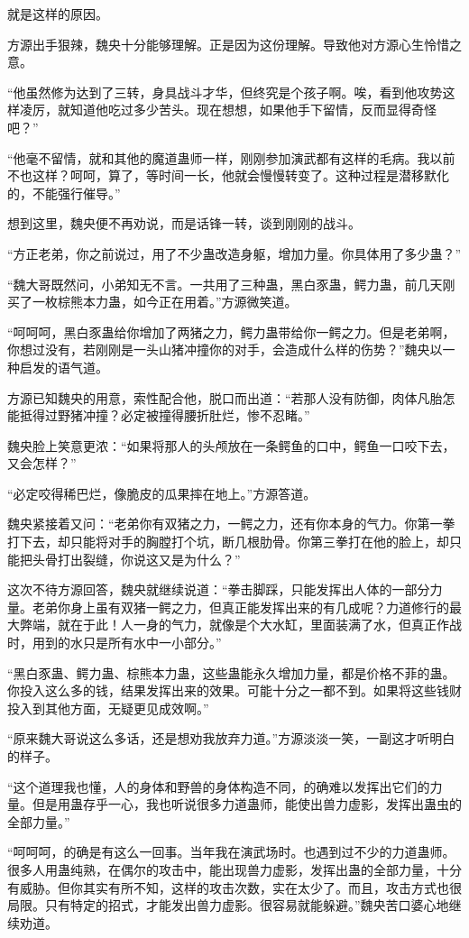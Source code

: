 \begin{this_body}
就是这样的原因。

方源出手狠辣，魏央十分能够理解。正是因为这份理解。导致他对方源心生怜惜之意。

“他虽然修为达到了三转，身具战斗才华，但终究是个孩子啊。唉，看到他攻势这样凌厉，就知道他吃过多少苦头。现在想想，如果他手下留情，反而显得奇怪吧？”

“他毫不留情，就和其他的魔道蛊师一样，刚刚参加演武都有这样的毛病。我以前不也这样？呵呵，算了，等时间一长，他就会慢慢转变了。这种过程是潜移默化的，不能强行催导。”

想到这里，魏央便不再劝说，而是话锋一转，谈到刚刚的战斗。

“方正老弟，你之前说过，用了不少蛊改造身躯，增加力量。你具体用了多少蛊？”

“魏大哥既然问，小弟知无不言。一共用了三种蛊，黑白豕蛊，鳄力蛊，前几天刚买了一枚棕熊本力蛊，如今正在用着。”方源微笑道。

“呵呵呵，黑白豕蛊给你增加了两猪之力，鳄力蛊带给你一鳄之力。但是老弟啊，你想过没有，若刚刚是一头山猪冲撞你的对手，会造成什么样的伤势？”魏央以一种启发的语气道。

方源已知魏央的用意，索性配合他，脱口而出道：“若那人没有防御，肉体凡胎怎能抵得过野猪冲撞？必定被撞得腰折肚烂，惨不忍睹。”

魏央脸上笑意更浓：“如果将那人的头颅放在一条鳄鱼的口中，鳄鱼一口咬下去，又会怎样？”

“必定咬得稀巴烂，像脆皮的瓜果摔在地上。”方源答道。

魏央紧接着又问：“老弟你有双猪之力，一鳄之力，还有你本身的气力。你第一拳打下去，却只能将对手的胸膛打个坑，断几根肋骨。你第三拳打在他的脸上，却只能把头骨打出裂缝，你说这又是为什么？”

这次不待方源回答，魏央就继续说道：“拳击脚踩，只能发挥出人体的一部分力量。老弟你身上虽有双猪一鳄之力，但真正能发挥出来的有几成呢？力道修行的最大弊端，就在于此！人一身的气力，就像是个大水缸，里面装满了水，但真正作战时，用到的水只是所有水中一小部分。”

“黑白豕蛊、鳄力蛊、棕熊本力蛊，这些蛊能永久增加力量，都是价格不菲的蛊。你投入这么多的钱，结果发挥出来的效果。可能十分之一都不到。如果将这些钱财投入到其他方面，无疑更见成效啊。”

“原来魏大哥说这么多话，还是想劝我放弃力道。”方源淡淡一笑，一副这才听明白的样子。

“这个道理我也懂，人的身体和野兽的身体构造不同，的确难以发挥出它们的力量。但是用蛊存乎一心，我也听说很多力道蛊师，能使出兽力虚影，发挥出蛊虫的全部力量。”

“呵呵呵，的确是有这么一回事。当年我在演武场时。也遇到过不少的力道蛊师。很多人用蛊纯熟，在偶尔的攻击中，能出现兽力虚影，发挥出蛊的全部力量，十分有威胁。但你其实有所不知，这样的攻击次数，实在太少了。而且，攻击方式也很局限。只有特定的招式，才能发出兽力虚影。很容易就能躲避。”魏央苦口婆心地继续劝道。


\end{this_body}

